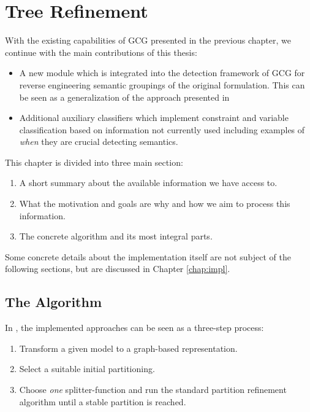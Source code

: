 \chapter{Tree Refinement}
\label{chap:tree}

	With the existing capabilities of \ac{GCG} presented in the previous chapter, we continue with the main contributions of this thesis:
	
	\begin{itemize}
		\item A new module which is integrated into the detection framework of \ac{GCG} for reverse engineering semantic groupings of the original formulation. This can be seen as a generalization of the approach presented in \cite{salvagninDetectingSemanticGroups2016}
		\item Additional auxiliary classifiers which implement constraint and variable classification based on information not currently used including examples of \textit{when} they are crucial detecting semantics.
	\end{itemize}

	This chapter is divided into three main section:
	
	\begin{enumerate}
		\item A short summary about the available information we have access to.
		\item What the motivation and goals are why and how we aim to process this information.
		\item The concrete algorithm and its most integral parts.
	\end{enumerate}
	
	Some concrete details about the implementation itself are not subject of the following sections, but are discussed in Chapter \ref{chap:impl}.

	\clearpage

	\section{The Algorithm}
	
		In \cite{salvagninDetectingSemanticGroups2016}, the implemented approaches can be seen as a three-step process:
		
		\begin{enumerate}
			\item Transform a given model to a graph-based representation.
			\item Select a suitable initial partitioning.
			\item Choose \textit{one} splitter-function and run the standard partition refinement algorithm until a stable partition is reached.
		\end{enumerate}
		
